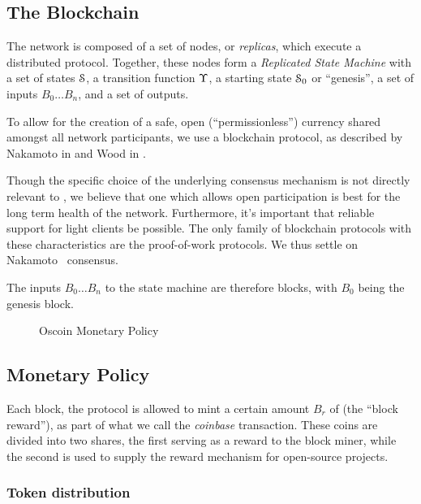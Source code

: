 \subsection{The \oscoin{} Blockchain}

The \oscoin{} network is composed of a set of nodes, or \emph{replicas}, which
execute a distributed protocol. Together, these nodes form a \emph{Replicated
State Machine} with a set of states $\mathcal{S}$, a transition function $\Upsilon$,
a starting state $\mathcal{S}_0$ or ``genesis'', a set of inputs $B_0 \dotso B_n$,
and a set of outputs.

To allow for the creation of a safe, open (``permissionless'') currency shared
amongst all network participants, we use a blockchain protocol, as described by
Nakamoto in \cite{bitcoin} and Wood in \cite{ethereum}.

Though the specific choice of the underlying consensus mechanism is not
directly relevant to \oscoin{}, we believe that one which allows open
participation is best for the long term health of the network. Furthermore,
it's important that reliable support for light clients be possible. The only
family of blockchain protocols with these characteristics are the proof-of-work
protocols. We thus settle on Nakamoto~\cite{bitcoin} consensus.

The inputs $B_0 \dotso B_n$ to the state machine are therefore blocks, with
$B_0$ being the genesis block.


\begin{figure*}[!ht]
    \par\medskip\noindent\minipage{\linewidth}
    \centering
    
    \caption{Oscoin Monetary Policy\label{f:oscoin}}
    \endminipage\par\medskip
\end{figure*}

\subsection{Monetary Policy}

Each block, the protocol is allowed to mint a certain amount $B_r$ of \oscoin{}
(the ``block reward''), as part of what we call the \emph{coinbase}
transaction. These coins are divided into two shares, the first serving as a
reward to the block miner, while the second is used to supply the reward
mechanism for open-source projects.

\subsubsection{Token distribution}

